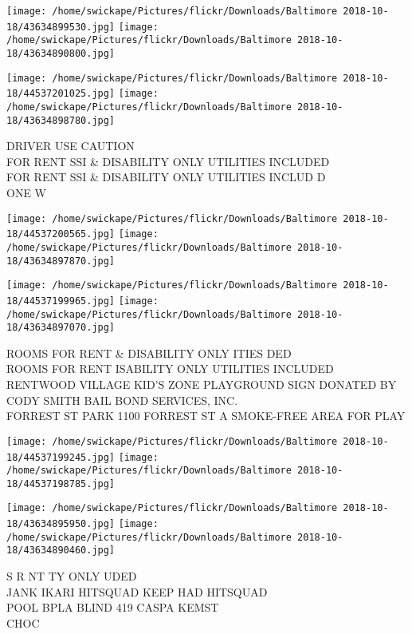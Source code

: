 \documentclass[10pt,letterpaper]{article}
\begin{document}
\texttt{[image: /home/swickape/Pictures/flickr/Downloads/Baltimore 2018-10-18/43634899530.jpg]}
\texttt{[image: /home/swickape/Pictures/flickr/Downloads/Baltimore 2018-10-18/43634890800.jpg]}

\texttt{[image: /home/swickape/Pictures/flickr/Downloads/Baltimore 2018-10-18/44537201025.jpg]}
\texttt{[image: /home/swickape/Pictures/flickr/Downloads/Baltimore 2018-10-18/43634898780.jpg]}

DRIVER USE CAUTION\\
FOR RENT SSI \& DISABILITY ONLY UTILITIES INCLUDED\\
FOR RENT SSI \& DISABILITY ONLY UTILITIES INCLUD D\\
ONE W\\
\pagebreak

\texttt{[image: /home/swickape/Pictures/flickr/Downloads/Baltimore 2018-10-18/44537200565.jpg]}
\texttt{[image: /home/swickape/Pictures/flickr/Downloads/Baltimore 2018-10-18/43634897870.jpg]}

\texttt{[image: /home/swickape/Pictures/flickr/Downloads/Baltimore 2018-10-18/44537199965.jpg]}
\texttt{[image: /home/swickape/Pictures/flickr/Downloads/Baltimore 2018-10-18/43634897070.jpg]}

ROOMS FOR RENT \& DISABILITY ONLY ITIES DED\\
ROOMS FOR RENT ISABILITY ONLY UTILITIES INCLUDED\\
RENTWOOD VILLAGE KID'S ZONE PLAYGROUND SIGN DONATED BY CODY SMITH BAIL BOND SERVICES, INC.\\
FORREST ST PARK 1100 FORREST ST A SMOKE{-}FREE AREA FOR PLAY\\
\pagebreak

\texttt{[image: /home/swickape/Pictures/flickr/Downloads/Baltimore 2018-10-18/44537199245.jpg]}
\texttt{[image: /home/swickape/Pictures/flickr/Downloads/Baltimore 2018-10-18/44537198785.jpg]}

\texttt{[image: /home/swickape/Pictures/flickr/Downloads/Baltimore 2018-10-18/43634895950.jpg]}
\texttt{[image: /home/swickape/Pictures/flickr/Downloads/Baltimore 2018-10-18/43634890460.jpg]}

S R NT TY ONLY UDED\\
JANK IKARI HITSQUAD KEEP HAD HITSQUAD\\
POOL BPLA BLIND 419 CASPA KEMST\\
CHOC\\
\pagebreak
\end{document}
